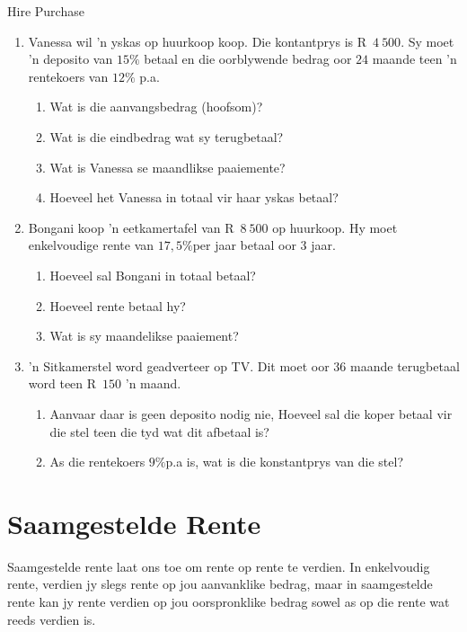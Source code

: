 \begin{exercises}{Hire Purchase}
{
    \begin{enumerate}[label=\textbf{\arabic*}.]
	\item Vanessa wil 'n yskas op huurkoop koop. Die kontantprys is R~$4~500$. Sy moet 'n deposito van $15\%$ betaal en die oorblywende bedrag oor $24$ maande teen 'n rentekoers van $12\%$ p.a.
	\begin{enumerate}
	    \item Wat is die aanvangsbedrag (hoofsom)?
	    \item Wat is die eindbedrag wat sy terugbetaal?
	    \item Wat is Vanessa se maandlikse paaiemente?
	    \item Hoeveel het Vanessa in totaal vir haar yskas betaal?
	\end{enumerate}


	\item Bongani koop ’n eetkamertafel van R~$8~500$ op huurkoop. Hy moet enkelvoudige rente van $17,5\%$per jaar
betaal oor 3 jaar.
	\begin{enumerate}
	    \item Hoeveel sal Bongani in totaal betaal?
	    \item  Hoeveel rente betaal hy?
	    \item Wat is sy maandelikse paaiement?
	\end{enumerate}

	\item 'n Sitkamerstel word geadverteer op TV. Dit moet oor $36$ maande terugbetaal word teen R~$150$ 'n maand.
	\begin{enumerate}
	    \item Aanvaar daar is geen deposito nodig nie, Hoeveel sal die koper betaal vir die stel teen die tyd wat dit afbetaal is?
	    \item As die rentekoers $9\%$p.a is, wat is die konstantprys van die stel?\\
	\end{enumerate}
    \end{enumerate}

}
\end{exercises}


\section{Saamgestelde Rente}

Saamgestelde rente laat ons toe om rente op rente te verdien. In enkelvoudig rente, verdien jy slegs rente op jou aanvanklike bedrag, maar in saamgestelde rente kan jy rente verdien op jou oorspronklike bedrag sowel as op die rente wat reeds verdien is.\par

